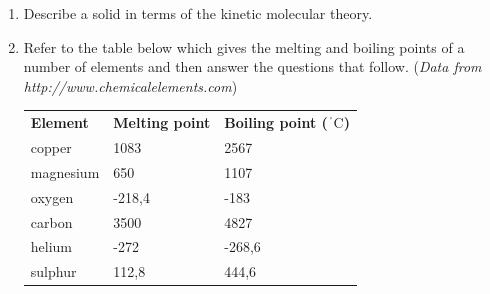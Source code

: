 \begin{enumerate}[noitemsep, label=\textbf{\arabic*}. ]
\label{m38730*id762}\item Describe a solid in terms of the kinetic molecular theory. \newline
            \label{m38730*uid108}\item Refer to the table below which gives the melting and 
boiling points of a number of elements and then answer the questions that 
follow. (\textsl{Data from 
http://www.chemicalelements.com})
          \begin{table}[H]
        \begin{center}
      \label{m38730*id311817}
    \noindent
      \tablelasttail{}
      \begin{xtabular}[t]{|l|l|l|}\hline
        \textbf{Element} &
        \textbf{Melting 
point} &
        \textbf{Boiling point (${}^{\ensuremath{{\,}^{\circ}}}\mathrm{C}$)}
     \tabularnewline{}
        copper &
        1083 &
        2567%
     \tabularnewline{}
        magnesium &
        650 &
        1107%
     \tabularnewline{}
        oxygen &
        -218,4 &
        -183%
     \tabularnewline{}
        carbon &
        3500 &
        4827%
     \tabularnewline{}
        helium &
        -272 &
        -268,6%
     \tabularnewline{}
        sulphur &
        112,8 &
        444,6%
     \tabularnewline{}

\end{xtabular}
\end{center}
\end{table}
\end{enumerate}
